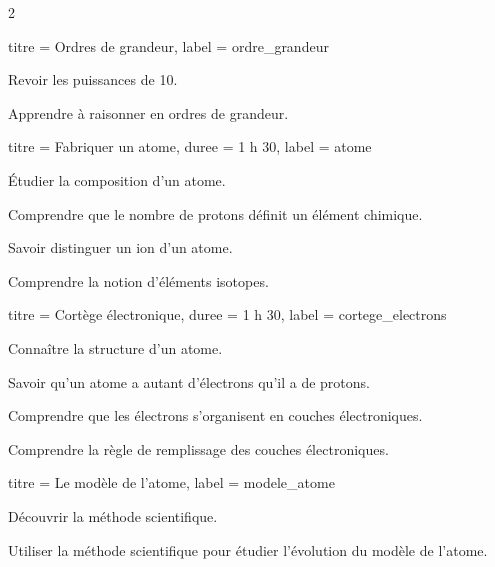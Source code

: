 \begin{multicols}{2}
  \setcounter{part}{0}
  \setcounter{activiteNum}{2}
  \begin{activite}{titre = Ordres de grandeur, label = ordre_grandeur}
    \begin{objectifs}  
      \item Revoir les puissances de 10.
      \item Apprendre à raisonner en ordres de grandeur.
    \end{objectifs}
  \end{activite}

  \vspace*{20pt}
  \setcounter{part}{5}
  \begin{TP}{titre = Fabriquer un atome, duree = 1 h 30, label = atome}
    \begin{objectifs}
      \item Étudier la composition d'un atome.
      \item Comprendre que le nombre de protons définit un élément chimique.
      \item Savoir distinguer un ion d'un atome.
      \item Comprendre la notion d'éléments isotopes.
    \end{objectifs}
  \end{TP}

  \medskip
  \setcounter{activiteNum}{1}
  \begin{activite}{titre = Cortège électronique, duree = 1 h 30, label = cortege_electrons}
    \begin{prerequis}
      \item Connaître la structure d'un atome.
      \item Savoir qu'un atome a autant d'électrons qu'il a de protons.
    \end{prerequis}
    \begin{objectifs}
      \item Comprendre que les électrons s'organisent en couches électroniques.
      \item Comprendre la règle de remplissage des couches électroniques.
    \end{objectifs}
  \end{activite}
  
  \begin{TP}{titre = Le modèle de l'atome, label = modele_atome}
    \begin{objectifs}
        \item Découvrir la méthode scientifique.
        \item Utiliser la méthode scientifique pour étudier l'évolution du modèle de l'atome.
    \end{objectifs}
  \end{TP}
  

\end{multicols}
